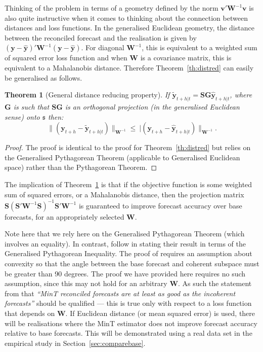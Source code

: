 \documentclass[12pt]{article}
\newtheorem{theo}{Theorem}[section]
\theoremstyle{definition}
\begin{document}
Thinking of the problem in terms of a geometry defined by the norm $\bm{v}'\bm{W}^{-1}\bm{v}$ is also quite instructive when it comes to thinking about the connection between distances and loss functions. In the generalised Euclidean geometry, the distance between the reconciled forecast and the realisation is given by $(\bm{y}-\hat{\bm{y}})'\bm{W}^{-1}(\bm{y}-\hat{\bm{y}})$. For diagonal $\bm{W}^{-1}$, this is equivalent to a weighted sum of squared error loss function and when $\bm{W}$ is a covariance matrix, this is equivalent to a Mahalanobis distance. Therefore Theorem~\ref{th:distred} can easily be generalised as follows.

\begin{theo}[General distance reducing property]\label{th:gdistred}
  If $\tilde{\bm{y}}_{t+h|t}=\bm{S}\bm{G}\hat{\bm{y}}_{t+h|t}$, where $\bm{G}$ is such that $\bm{S}\bm{G}$ is an orthogonal projection (in the generalised Euclidean sense) onto $\mathfrak{s}$ then:
  \begin{equation*}
    \|(\bm{y}_{t+h}-\tilde{\bm{y}}_{t+h|t})\|_{\bm{W}^{-1}}
      \le\
    |(\bm{y}_{t+h}-\hat{\bm{y}}_{t+h|t})\|_{\bm{W}^{-1}}.
  \end{equation*}
\end{theo}
\begin{proof}
  The proof is identical to the proof for Theorem~\ref{th:distred} but relies on the Generalised Pythagorean Theorem (applicable to Generalised Euclidean space) rather than the Pythagorean Theorem.
  \end{proof}

The implication of Theorem~\ref{th:gdistred} is that if the objective function is some weighted sum of squared errors, or a Mahalanobis distance, then the projection matrix $\bm{S}(\bm{S}'\bm{W}^{-1}\bm{S})^{-1}\bm{S}'\bm{W}^{-1}$ is guaranteed to improve forecast accuracy over base forecasts, for an appropriately selected $\bm{W}$.

Note here that we rely here on the Generalised Pythagorean Theorem (which involves an equality). In contrast, \citet{WicEtAl2019} follow \citet{VanErven2015a} in stating their result in terms of the Generalised Pythagorean Inequality. The proof of \citet{WicEtAl2019} requires an assumption about convexity so that the angle between the base forecast and coherent subspace must be greater than 90 degrees. The proof we have provided here requires no such assumption, since this may not hold for an arbitrary $\bm{W}$. As such the statement from \citet{WicEtAl2019} that \emph{``MinT reconciled forecasts are at least as good as the incoherent forecasts''} should be qualified --- this is true only with respect to a loss function that depends on $\bm{W}$. If Euclidean distance (or mean squared error) is used, there will be realisations where the MinT estimator does not improve forecast accuracy relative to base forecasts. This will be demonstrated using a real data set in the empirical study in Section~\ref{sec:comparebase}.
\end{document}
